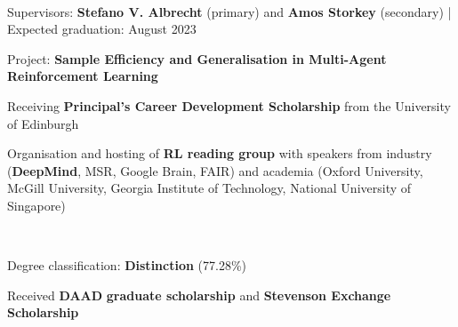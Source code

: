 \documentclass[]{lukas-cv-openfont}
\begin{document}


\vspace{1em}


\noindent
{}
\\
\begin{tightitemize}{1.7em}
    \item Supervisors: \textbf{Stefano V. Albrecht} (primary) and \textbf{Amos Storkey} (secondary) | Expected graduation: August 2023
    \item Project: \textbf{Sample Efficiency and Generalisation in Multi-Agent Reinforcement Learning}
    \item Receiving \textbf{Principal's Career Development Scholarship} from the University of Edinburgh
    \item Organisation and hosting of \textbf{RL reading group} with speakers from industry (\textbf{DeepMind}, MSR, Google Brain, FAIR) and academia (Oxford University, McGill University, Georgia Institute of Technology, National University of Singapore)
\end{tightitemize}
\largesectionsep

\noindent
{}
\\
\begin{tightitemize}{1.7em}
    \item Degree classification: \textbf{Distinction} (77.28\%)
    \item Received \textbf{DAAD} \textbf{graduate scholarship} and \textbf{Stevenson Exchange Scholarship} 
\end{tightitemize}
\largesectionsep
\end{document}
